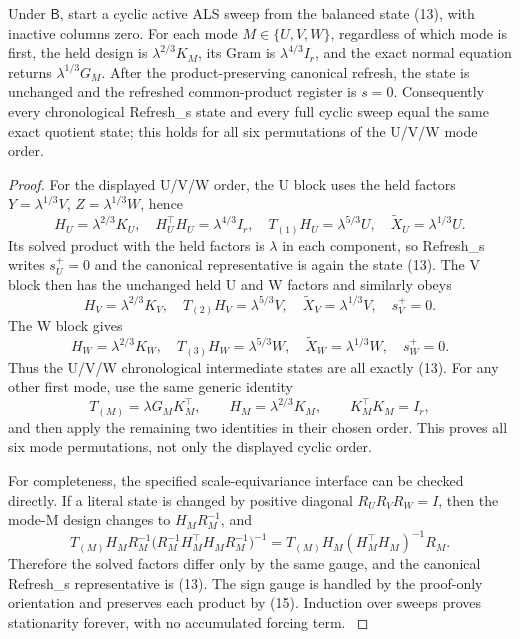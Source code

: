 \begin{proposition}\label{prop:step-013-cyclic-fixed}
Under \(\mathsf B\), start a
cyclic active ALS sweep from the balanced state (13), with inactive columns
zero. For each mode \(M\in\{U,V,W\}\), regardless of which mode is first,
the held design is \(\lambda^{2/3}K_M\), its Gram is
\(\lambda^{4/3}I_r\), and the exact normal equation returns
\(\lambda^{1/3}G_M\). After the product-preserving canonical refresh, the
state is unchanged and the refreshed common-product register is \(s=0\).
Consequently every chronological Refresh\_s state and every full cyclic
sweep equal the same exact quotient state; this holds for all six
permutations of the U/V/W mode order.

\begin{proof}
For the displayed U/V/W order, the U block uses
the held factors \(Y=\lambda^{1/3}V\), \(Z=\lambda^{1/3}W\), hence
\[
H_U=\lambda^{2/3}K_U,\quad H_U^\top H_U=\lambda^{4/3}I_r,\quad
T_{(1)}H_U=\lambda^{5/3}U,\quad
\widetilde X_U=\lambda^{1/3}U.
\tag{16}
\]
Its solved product with the held factors is \(\lambda\) in each component,
so Refresh\_s writes \(s_U^+=0\) and the canonical representative is again
the state (13). The V block then has the unchanged held U and W factors and
similarly obeys
\[
H_V=\lambda^{2/3}K_V,\quad
T_{(2)}H_V=\lambda^{5/3}V,\quad
\widetilde X_V=\lambda^{1/3}V,\quad s_V^+=0.
\tag{17}
\]
The W block gives
\[
H_W=\lambda^{2/3}K_W,\quad
T_{(3)}H_W=\lambda^{5/3}W,\quad
\widetilde X_W=\lambda^{1/3}W,\quad s_W^+=0.
\tag{18}
\]
Thus the U/V/W chronological intermediate states are all exactly (13).
For any other first mode, use the same generic identity
\[
T_{(M)}=\lambda G_MK_M^\top,\qquad
H_M=\lambda^{2/3}K_M,\qquad K_M^\top K_M=I_r,
\tag{19}
\]
and then apply the remaining two identities in their chosen order. This
proves all six mode permutations, not only the displayed cyclic order.

For completeness, the specified scale-equivariance interface can be checked
directly. If a literal state is changed by positive diagonal
\(R_UR_VR_W=I\), then the mode-M design changes to \(H_MR_M^{-1}\), and
\[
T_{(M)}H_MR_M^{-1}
\big(R_M^{-1}H_M^\top H_MR_M^{-1}\big)^{-1}
=T_{(M)}H_M(H_M^\top H_M)^{-1}R_M.
\tag{20}
\]
Therefore the solved factors differ only by the same gauge, and the
canonical Refresh\_s representative is (13). The sign gauge is handled by
the proof-only orientation and preserves each product by (15). Induction
over sweeps proves stationarity forever, with no accumulated forcing term.
\(\)


\end{proof}
\end{proposition}
